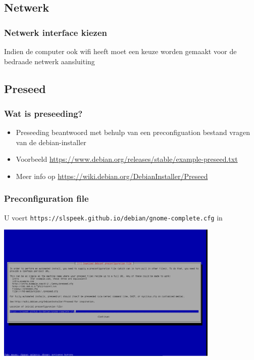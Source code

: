 \documentclass{beamer}
\begin{document}
\subsection{Netwerk}

\begin{frame}
   \frametitle{Netwerk interface kiezen}
   Indien de computer ook wifi heeft moet een keuze worden gemaakt voor de bedraade netwerk aansluiting
\end{frame}

\subsection{Preseed}
\begin{frame}
   \frametitle{Wat is preseeding?}
   \begin{itemize}
      \item Preseeding beantwoord met behulp van een preconfiguation bestand vragen van de debian-installer
      \item Voorbeeld \href{https://www.debian.org/releases/stable/example-preseed.txt}{https://www.debian.org/releases/stable/example-preseed.txt}
      \item Meer info op \href{https://wiki.debian.org/DebianInstaller/Preseed}{https://wiki.debian.org/DebianInstaller/Preseed}
   \end{itemize}


\end{frame}

\begin{frame}
   \frametitle{Preconfiguration file}
   U voert \texttt{https://slspeek.github.io/debian/gnome-complete.cfg} in
   
   \centering
   \includegraphics[width=0.8\textwidth]{img/preseed-adres.png}
\end{frame}
\end{document}

